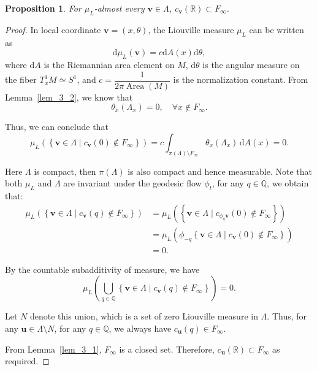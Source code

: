 \documentclass[reqno,11pt]{article}
\newtheorem{proposition}{Proposition}[section]
\theoremstyle{definition}
\theoremstyle{remark}
\numberwithin{equation}{section}
\DeclareMathOperator{\area}{Area}
\begin{document}
\begin{proposition}\label{prop_3_1}
	For $\mu_{L}$-almost every $\bm{v}\in\Lambda$, $c_{\bm{v}}(\mathbb{R})\subset F_{\infty}$.
\end{proposition}
\begin{proof}
	In local coordinate $\bm{v}=(x,\theta)$, the Liouville measure $\mu_L$ can be written as
	\begin{equation}
		\mathrm{d}\mu_L(\bm{v})=c\mathrm{d}A(x)\mathrm{d}\theta,
	\end{equation}
	where $\mathrm{d}A$ is the Riemannian area element on $M$, $\mathrm{d}\theta$ is the angular measure on the fiber $T^{1}_x M\simeq S^1$, and $c=\dfrac{1}{2\pi \area(M)}$ is the normalization constant. From Lemma~\ref{lem_3_2}, we know that
	\begin{displaymath}
		\theta_{x}(\Lambda_{x})=0,\quad \forall x\notin F_{\infty}.
	\end{displaymath}

	Thus, we can conclude that
	\begin{displaymath}
		\mu_{L}(\left\{\bm{v}\in\Lambda\mid c_{\bm{v}}(0)\notin F_{\infty}\right\})=c\int_{\pi(\Lambda)\setminus F_{\infty}}\theta_{x}(\Lambda_{x})\,\mathrm{d}A(x)=0.
	\end{displaymath}

	Here $\Lambda$ is compact, then $\pi(\Lambda)$ is also compact and hence measurable. Note that both $\mu_L$ and $\Lambda$ are invariant under the geodesic flow $\phi_t$, for any $q\in\mathbb{Q}$, we obtain that:
	\begin{displaymath}
		\begin{aligned}
			\mu_L\left(\left\{\bm{v}\in\Lambda\mid c_{\bm{v}}(q)\notin F_{\infty}\right\}\right) & =\mu_L\left(\left\{\bm{v}\in\Lambda\mid c_{\phi_{q}\bm{v}}(0)\notin F_{\infty}\right\}\right)    \\
			                                                                                     & =\mu_{L}\left(\phi_{-q}\left\{\bm{v}\in\Lambda\mid c_{\bm{v}}(0)\notin F_{\infty}\right\}\right) \\
			                                                                                     & =0.
		\end{aligned}
	\end{displaymath}

	By the countable subadditivity of measure, we have
	\begin{displaymath}
		\mu_L\left(\bigcup_{q\in\mathbb{Q}}\left\{\bm{v}\in\Lambda\mid c_{\bm{v}}(q)\notin F_{\infty}\right\}\right)=0.
	\end{displaymath}

	Let $N$ denote this union, which is a set of zero Liouville measure in $\Lambda$. Thus, for any $\bm{u}\in\Lambda\setminus N$, for any $q\in\mathbb{Q}$, we always have $c_{\bm{u}}(q)\in F_{\infty}$.

	From Lemma~\ref{lem_3_1}, $F_{\infty}$ is a closed set. Therefore, $c_{\bm{u}}(\mathbb{R})\subset F_{\infty}$ as required.
\end{proof}
\end{document}
